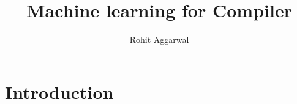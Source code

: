 \documentclass[a4paper,twoside]{iiththesis}
\title{Machine learning for Compiler}
\author{Rohit Aggarwal}
\begin{document}
\chapter{Introduction}

	
	
	   
    	
\end{document}
